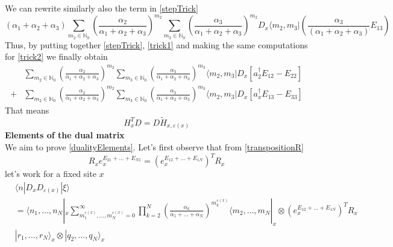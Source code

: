\documentclass[11pt]{article}
\numberwithin{equation}{section}
\begin{document}
We can rewrite similarly also the term in \eqref{stepTrick}
\begin{equation}\label{trick2}
    (\alpha_{1}+\alpha_{2}+\alpha_{3})\sum_{m_{2}\in\mathbb{N}_{0}}	\left(\frac{\alpha_{2}}{\alpha_{1}+\alpha_{2}+\alpha_{3}}\right)^{m_{2}}\sum_{m_{3}\in \mathbb{N}_{0}}\left(\frac{\alpha_{3}}{\alpha_{1}+\alpha_{2}+\alpha_{3}}\right)^{m_{2}}D_{x}\langle m_{2},m_{3}|\left(\frac{\alpha_{3}}{(\alpha_{1}+\alpha_{2}+\alpha_{3})}E_{13}\right)
\end{equation}
Thus, by putting together \eqref{stepTrick}, \eqref{trick1} and making the same computations for \eqref{trick2} we finally obtain
\begin{equation}
\begin{split}
&\sum_{m_{2}\in\mathbb{N}_{0}}	\left(\frac{\alpha_{2}}{\alpha_{1}+\alpha_{2}+\alpha_{3}}\right)^{m_{2}}\sum_{m_{3}\in \mathbb{N}_{0}}\left(\frac{\alpha_{3}}{\alpha_{1}+\alpha_{2}+\alpha_{3}}\right)^{m_{3}}\langle m_{2},m_{3}|D_{x}\left[a_{2}^{\dagger}E_{12}-E_{22}\right]\\ +&
\sum_{m_{2}\in\mathbb{N}_{0}}	\left(\frac{\alpha_{2}}{\alpha_{1}+\alpha_{2}+\alpha_{3}}\right)^{m_{2}}\sum_{m_{3}\in \mathbb{N}_{0}}\left(\frac{\alpha_{3}}{\alpha_{1}+\alpha_{2}+\alpha_{3}}\right)^{m_{3}}\langle m_{2},m_{3}|D_{x}\left[a_{x}^{\dagger}E_{13}-E_{33}\right]
\end{split}
\end{equation}
That means 
\begin{equation}
	H^{T}_{x}D=D\widetilde{H}_{x,\varepsilon(x)}
\end{equation}
\textbf{Elements of the dual matrix}\\
We aim to prove \eqref{dualityElements}. Let's first observe that from \eqref{transpositionR}
\begin{equation}
R_{x}e_{x}^{E_{21}+\ldots+E_{N1}}=(e^{E_{12}+\ldots+E_{1N}}_{x})^{T}R_{x}
\end{equation}
let's work for a fixed site $x$
\begin{align*}
	 &\langle n|D_{x}D_{\varepsilon(x)}|\xi\rangle\\&=\langle n_{1},\ldots,n_{N}|_{x}\sum_{m_{1}^{\varepsilon(x)},\ldots,m_{N}^{\varepsilon(x)}=0}^{\infty}\prod_{k=2}^{N}\left(\frac{\alpha_{k}}{\alpha_{1}+\ldots+\alpha_{N}}\right)^{m_{k}^{\varepsilon(x)}}\langle m_{2},\ldots,m_{N}|_{x}
	 \otimes(e_{x}^{E_{12}+\ldots+E_{1N}})^{T}R_{x}\\&|r_{1},\ldots,r_{N}\rangle_{x} \otimes |q_{2},\ldots,q_{N}\rangle_{x}
\end{align*}
\end{document}
